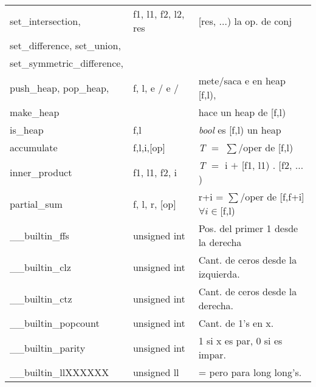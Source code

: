 \begin{tabular}{|l|l|p{5.4cm}|}
set\_intersection, & f1, l1, f2, l2, res & [res, $\ldots$) la op. de conj\\
set\_difference, set\_union, & & \\
set\_symmetric\_difference, & &\\\hline
push\_heap, pop\_heap, & f, l, e / e / & mete/saca e en heap [f,l), \\
make\_heap & & hace un heap de [f,l)\\\hline
is\_heap & f,l & \textit{bool} es [f,l) un heap\\\hline
accumulate & f,l,i,[op] & \textit{T} $=$ $\sum$/oper de [f,l)\\\hline
inner\_product & f1, l1, f2, i & \textit{T} $=$ i $+$ [f1, l1) . [f2, $\ldots$ )\\\hline
partial\_sum & f, l, r, [op] & r+i = $\sum$/oper de [f,f+i] $\forall i \in$[f,l)\\\hline
\_\_builtin\_ffs& unsigned int & Pos. del primer 1 desde la derecha\\\hline
\_\_builtin\_clz & unsigned int & Cant. de ceros desde la izquierda.\\\hline
\_\_builtin\_ctz & unsigned int & Cant. de ceros desde la derecha.\\\hline
\_\_builtin\_popcount & unsigned int & Cant. de 1’s en x.\\\hline
\_\_builtin\_parity & unsigned int & 1 si x es par, 0 si es impar.\\\hline
\_\_builtin\_llXXXXXX & unsigned ll & = pero para long long's.\\\hline
\end{tabular}
